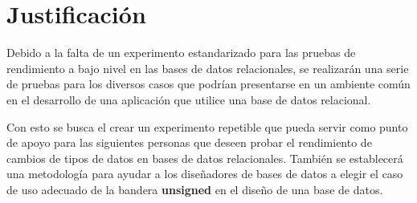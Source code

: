 \section{Justificación}


Debido a la falta de un experimento estandarizado para las pruebas de rendimiento a bajo nivel en las bases de datos relacionales, se realizarán una serie de pruebas para los diversos casos que podrían presentarse en un ambiente común en el desarrollo de una aplicación que utilice una base de datos relacional.

Con esto se busca el crear un experimento repetible que pueda servir como punto de apoyo para las siguientes personas que deseen probar el rendimiento de cambios de tipos de datos en bases de datos relacionales. También se establecerá una metodología para ayudar a los diseñadores de bases de datos a elegir el caso de uso adecuado de la bandera \textbf{unsigned} en el diseño de una base de datos.

